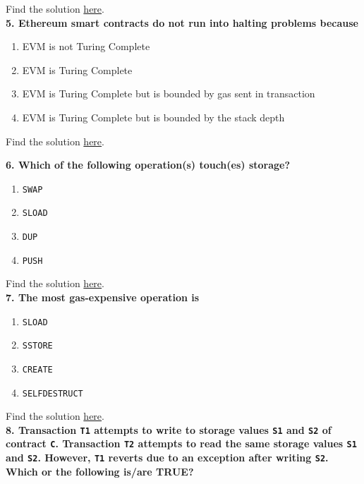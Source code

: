Find the solution \hyperref[sec:exam1_q4]{here}.\\

\textbf{5. Ethereum smart contracts do not run into halting problems because}

\begin{enumerate}[label=\Alph*.]
    \item EVM is not Turing Complete
    \item EVM is Turing Complete
    \item EVM is Turing Complete but is bounded by gas sent in transaction
    \item EVM is Turing Complete but is bounded by the stack depth
\end{enumerate}

Find the solution \hyperref[sec:exam1_q5]{here}.\\

\pagebreak

\textbf{6. Which of the following operation(s) touch(es) storage?}

\begin{enumerate}[label=\Alph*.]
    \item\verb|SWAP|
    \item\verb|SLOAD|
    \item\verb|DUP|
    \item\verb|PUSH|
\end{enumerate}

Find the solution \hyperref[sec:exam1_q6]{here}.\\

\textbf{7. The most gas-expensive operation is}

\begin{enumerate}[label=\Alph*.]
    \item\verb|SLOAD|
    \item\verb|SSTORE|
    \item\verb|CREATE|
    \item\verb|SELFDESTRUCT|
\end{enumerate}

Find the solution \hyperref[sec:exam1_q7]{here}.\\

\textbf{8. Transaction \texttt{T1} attempts to write to storage values \texttt{S1} and \texttt{S2} of contract \texttt{C}.
Transaction \texttt{T2} attempts to read the same storage values \texttt{S1} and \texttt{S2}.
However, \texttt{T1} reverts due to an exception after writing \texttt{S2}. Which or the following is/are TRUE?}

